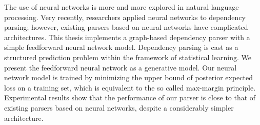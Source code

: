 The use of neural networks is more and more explored in natural language processing. Very recently, researchers applied neural networks to dependency parsing; however, existing parsers based on neural networks have complicated architectures. This thesis implements a graph-based dependency parser with a simple feedforward neural network model. Dependency parsing is cast as a structured prediction problem within the framework of statistical learning. We present the feedforward neural network as a generative model. Our neural network model is trained by minimizing the upper bound of posterior expected loss on a training set, which is equivalent to the so called max-margin principle. Experimental results show that the performance of our parser is close to that of existing parsers based on neural networks, despite a considerably simpler architecture.




